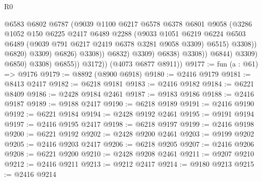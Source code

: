 \begin{lexlean}{R0}
\begin{coremodule}
                                          @6583
                                          @6802
                                          @6787
                                          (@9039
                                            @1100
                                            @6217
                                            @6578
                                            @6378
                                            @6801
                                            @9058
                                            (@3286
                                              @1052
                                              @150
                                              @6225
                                              @2417
                                              @6489
                                              @2288
                                              (@9033
                                                @1051
                                                @6219
                                                @6224
                                                @6503
                                                @6489
                                                (@9039 @791 @6217 @2419 @6378 @3281 @9058 @3309)
                                                @6515)
                                              @3308))
                                          @6820)
                                        @3309)
                                      @6826)
                                    @3308))
                                @6832)
                              @3309)
                            @6838)
                          @3308))
                      @6844)
                    @3309)
                  @6850)
                @3308)
              @6855))
          @3172))
      (@4073 @6877 @8911))
@9177 := fun (a : @61) => @9176
@9179 := @8892 (@8900 @6918)
@9180 := @2416 @9179
@9181 := @8413 @2417
@9182 := @6218 @9181
@9183 := @2416 @9182
@9184 := @6221 @8409
@9186 := @2428 @9184 @2461
@9187 := @9183 @9186
@9188 := @2416 @9187
@9189 := @9188 @2417
@9190 := @6218 @9189
@9191 := @2416 @9190
@9192 := @6221 @9184
@9194 := @2428 @9192 @2461
@9195 := @9191 @9194
@9197 := @2416 @9195 @2417
@9198 := @6218 @9197
@9199 := @2416 @9198
@9200 := @6221 @9192
@9202 := @2428 @9200 @2461
@9203 := @9199 @9202
@9205 := @2416 @9203 @2417
@9206 := @6218 @9205
@9207 := @2416 @9206
@9208 := @6221 @9200
@9210 := @2428 @9208 @2461
@9211 := @9207 @9210
@9212 := @2416 @9211
@9213 := @9212 @2417
@9214 := @9180 @9213
@9215 := @2416 @9214

\end{coremodule}
\end{lexlean}
